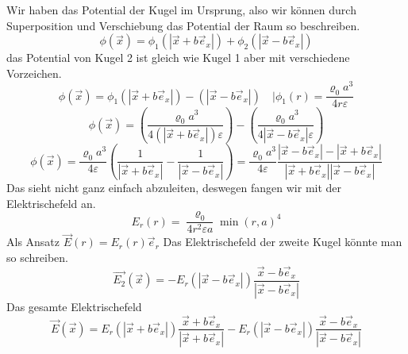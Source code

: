 \documentclass{scrartcl}
\begin{document}
\begin{itemize}
Wir haben das Potential der Kugel im Ursprung, also wir können durch Superposition und Verschiebung das Potential der Raum so beschreiben.
\[\phi(\vec{x})=\phi_1(|\vec{x}+b \vec{e}_x|)+\phi_2(|\vec{x}-b \vec{e}_x|)\]
das Potential von Kugel 2 ist gleich wie Kugel 1 aber mit verschiedene Vorzeichen.
\[\phi(\vec{x})=\phi_1(|\vec{x}+b \vec{e}_x|)-(|\vec{x}-b \vec{e}_x|)\quad | \phi_1(r)=\frac{\varrho_0 a^3}{4 r \varepsilon}\]
\[\phi(\vec{x})=\left(\frac{\varrho_0 a^3}{4 (|\vec{x}+b \vec{e}_x|)\varepsilon}\right)-\left(\frac{\varrho_0 a^3}{4|\vec{x}-b \vec{e}_x| \varepsilon}\right)\]
\[\phi(\vec{x})=\frac{\varrho_0 a^3}{4\varepsilon}\left(\frac{1}{ |\vec{x}+b \vec{e}_x|}-\frac{1}{|\vec{x}-b \vec{e}_x|}\right)
=\frac{\varrho_0 a^3}{4\varepsilon}\frac{|\vec{x}-b \vec{e}_x|- |\vec{x}+b \vec{e}_x|}{ |\vec{x}+b \vec{e}_x| |\vec{x}-b \vec{e}_x|}\]
Das sieht nicht ganz einfach abzuleiten, deswegen fangen wir mit der Elektrischefeld an.
\[ E_r(r)  =\frac{\varrho_0}{4 r^2 \varepsilon a} {\min(r,a)}^4 \]
Als Ansatz $\vec{E}(r)=E_r(r)\vec{e}_r$
Das Elektrischefeld der zweite Kugel könnte man so schreiben.
\[ \vec{E_2}(\vec{x})  =-E_r(|\vec{x}-b\vec{e}_x|)\frac{\vec{x}-b\vec{e}_x}{|\vec{x}-b\vec{e}_x|}\]
Das gesamte Elektrischefeld
\[ \vec{E}(\vec{x})  =E_r(|\vec{x}+b\vec{e}_x|)\frac{\vec{x}+b\vec{e}_x}{|\vec{x}+b\vec{e}_x|}-E_r(|\vec{x}-b\vec{e}_x|)\frac{\vec{x}-b\vec{e}_x}{|\vec{x}-b\vec{e}_x|}\]

\end{itemize}
\end{document}
